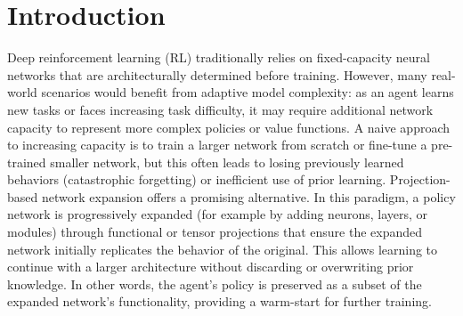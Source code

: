 \section{Introduction}
Deep reinforcement learning (RL) traditionally relies on fixed-capacity neural networks that are architecturally determined before training. However, many real-world scenarios would benefit from adaptive model complexity: as an agent learns new tasks or faces increasing task difficulty, it may require additional network capacity to represent more complex policies or value functions. A naive approach to increasing capacity is to train a larger network from scratch or fine-tune a pre-trained smaller network, but this often leads to losing previously learned behaviors (catastrophic forgetting) or inefficient use of prior learning. Projection-based network expansion offers a promising alternative. In this paradigm, a policy network is progressively expanded (for example by adding neurons, layers, or modules) through functional or tensor projections that ensure the expanded network initially replicates the behavior of the original. This allows learning to continue with a larger architecture without discarding or overwriting prior knowledge. In other words, the agent’s policy is preserved as a subset of the expanded network’s functionality, providing a warm-start for further training.

